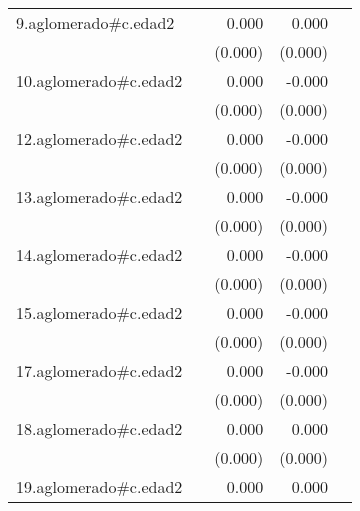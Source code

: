 {\begin{longtable}{l*{4}{D{.}{.}{-1}}}
\addlinespace
9.aglomerado#c.edad2&                     &       0.000         &       0.000         &                     \\
            &                     &     (0.000)         &     (0.000)         &                     \\
\addlinespace
10.aglomerado#c.edad2&                     &       0.000         &      -0.000         &                     \\
            &                     &     (0.000)         &     (0.000)         &                     \\
\addlinespace
12.aglomerado#c.edad2&                     &       0.000         &      -0.000         &                     \\
            &                     &     (0.000)         &     (0.000)         &                     \\
\addlinespace
13.aglomerado#c.edad2&                     &       0.000         &      -0.000         &                     \\
            &                     &     (0.000)         &     (0.000)         &                     \\
\addlinespace
14.aglomerado#c.edad2&                     &       0.000         &      -0.000         &                     \\
            &                     &     (0.000)         &     (0.000)         &                     \\
\addlinespace
15.aglomerado#c.edad2&                     &       0.000         &      -0.000         &                     \\
            &                     &     (0.000)         &     (0.000)         &                     \\
\addlinespace
17.aglomerado#c.edad2&                     &       0.000         &      -0.000         &                     \\
            &                     &     (0.000)         &     (0.000)         &                     \\
\addlinespace
18.aglomerado#c.edad2&                     &       0.000         &       0.000         &                     \\
            &                     &     (0.000)         &     (0.000)         &                     \\
\addlinespace
19.aglomerado#c.edad2&                     &       0.000\sym{*}  &       0.000         &                     \\

\end{longtable}}
